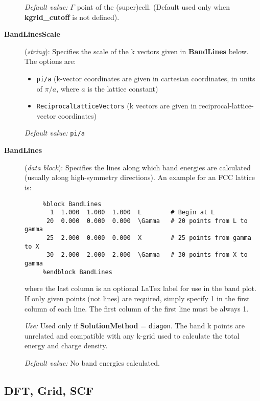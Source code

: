 \begin{description}
{\it Default value:} $\Gamma$ point of the (super)cell.
(Default used only when {\bf kgrid\_cutoff} is not defined).
        


\item[{\bf BandLinesScale}] ({\it string}): 
Specifies the scale of the k vectors given in {\bf BandLines} below.
The options are:
\begin{itemize}
\item {\tt pi/a} (k-vector coordinates are given in cartesian 
coordinates, in units of $\pi/a$, where $a$ is the lattice constant)
\item {\tt ReciprocalLatticeVectors} (k vectors are given in
reciprocal-lattice-vector coordinates)
\end{itemize}

{\it Default value:} {\tt pi/a}


\item[{\bf BandLines}] ({\it data block}): 
Specifies the lines along which band energies are calculated
(usually along high-symmetry directions).
An example for an FCC lattice is:

\begin{verbatim}
     %block BandLines
       1  1.000  1.000  1.000  L        # Begin at L
      20  0.000  0.000  0.000  \Gamma   # 20 points from L to gamma
      25  2.000  0.000  0.000  X        # 25 points from gamma to X
      30  2.000  2.000  2.000  \Gamma   # 30 points from X to gamma
     %endblock BandLines
\end{verbatim}

where the last column is an optional LaTex label for use in the band plot.
If only given points (not lines) are required, simply specify 1 in the
first column of each line. The first column of the first line must be 
always 1.

{\it Use:} Used only if {\bf SolutionMethod} = {\tt diagon}.
The band k points are unrelated and compatible with any k-grid used
to calculate the total energy and charge density.

{\it Default value:} No band energies calculated.


\end{description}



\vspace{5pt}
\subsection{DFT, Grid, SCF}

